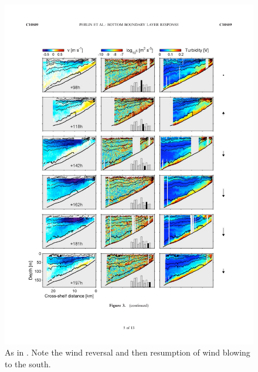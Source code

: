 \begin{figure}[hbt]
  \begin{center}
  \includegraphics{figs/WindOverview/PerlinFig3b}
    \caption{As in .  Note the wind reversal and then resumption of wind blowing to the south.}
    \label{fig:PerlinFig3b}  
  \end{center}
\end{figure}

